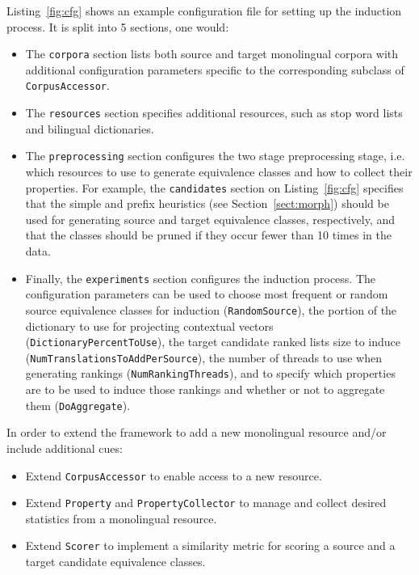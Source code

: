 \documentclass{article}
\newcommand{\secref}[1]{Section~\ref{#1}}
\newcommand{\lstref}[1]{Listing~\ref{#1}}
\newcommand{\code}[1]{{\small \tt #1}}
\begin{document}
\lstref{fig:cfg} shows an example configuration file for setting up the induction process.  It is split into 5 sections, one would:

\begin{itemize}
  \item The \code{corpora} section lists both source and target monolingual corpora with additional configuration parameters specific to the corresponding subclass of \code{CorpusAccessor}.
  \item The \code{resources} section specifies additional resources, such as stop word lists and bilingual dictionaries.
  \item The \code{preprocessing} section configures the two stage preprocessing stage, i.e. which resources to use to generate equivalence classes and how to collect their properties.  For example, the \code{candidates} section on \lstref{fig:cfg} specifies that the simple and prefix heuristics (see \secref{sect:morph}) should be used for generating source and target equivalence classes, respectively, and that the classes should be pruned if they occur fewer than 10 times in the data.
  \item Finally, the \code{experiments} section configures the induction process.  The configuration parameters can be used to choose most frequent or random source equivalence classes for induction (\code{RandomSource}), the portion of the dictionary to use for projecting contextual vectors (\code{DictionaryPercentToUse}), the target candidate ranked lists size to induce  (\code{NumTranslationsToAddPerSource}), the number of threads to use when generating rankings (\code{NumRankingThreads}), and to specify which properties are to be used to induce those rankings and whether or not to aggregate them (\code{DoAggregate}).\\
\end{itemize}

In order to extend the framework to add a new monolingual resource and/or include additional cues:

\begin{itemize}
  \item Extend \code{CorpusAccessor} to enable access to a new resource.
  \item Extend \code{Property} and \code{PropertyCollector} to manage and collect desired statistics from a monolingual resource.
  \item Extend \code{Scorer} to implement a similarity metric for scoring a source and a target candidate equivalence classes.
\end{itemize}
\end{document}
